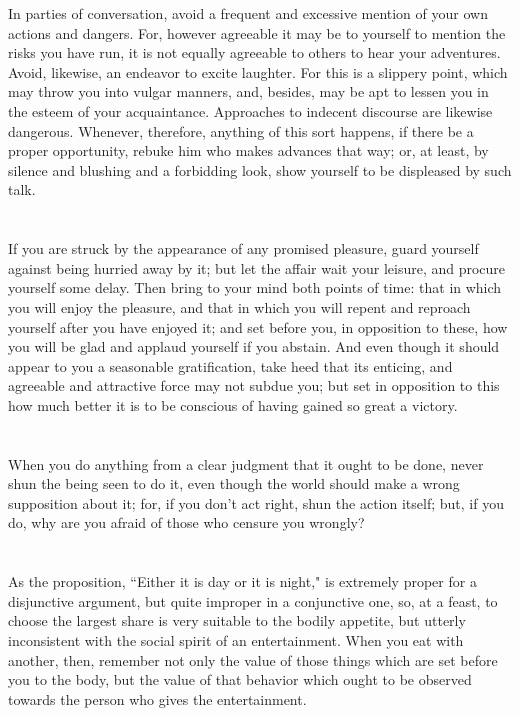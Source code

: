 \documentclass[12pt]{article}
\begin{document}
In parties of conversation, avoid a frequent and excessive mention
of your own actions and dangers. For, however agreeable it may be
to yourself to mention the risks you have run, it is not equally agreeable
to others to hear your adventures. Avoid, likewise, an endeavor to
excite laughter. For this is a slippery point, which may throw you
into vulgar manners, and, besides, may be apt to lessen you in the
esteem of your acquaintance. Approaches to indecent discourse are
likewise dangerous. Whenever, therefore, anything of this sort happens,
if there be a proper opportunity, rebuke him who makes advances that
way; or, at least, by silence and blushing and a forbidding look,
show yourself to be displeased by such talk. 

\section{}

If you are struck by the appearance of any promised pleasure,
guard yourself against being hurried away by it; but let the affair
wait your leisure, and procure yourself some delay. Then bring to
your mind both points of time: that in which you will enjoy the pleasure,
and that in which you will repent and reproach yourself after you
have enjoyed it; and set before you, in opposition to these, how you
will be glad and applaud yourself if you abstain. And even though
it should appear to you a seasonable gratification, take heed that
its enticing, and agreeable and attractive force may not subdue you;
but set in opposition to this how much better it is to be conscious
of having gained so great a victory. 

\section{}

When you do anything from a clear judgment that it ought to be
done, never shun the being seen to do it, even though the world should
make a wrong supposition about it; for, if you don't act right, shun
the action itself; but, if you do, why are you afraid of those who
censure you wrongly? 

\section{}

As the proposition, ``Either it is day or it is night," is extremely
proper for a disjunctive argument, but quite improper in a conjunctive
one, so, at a feast, to choose the largest share is very suitable
to the bodily appetite, but utterly inconsistent with the social spirit
of an entertainment. When you eat with another, then, remember not
only the value of those things which are set before you to the body,
but the value of that behavior which ought to be observed towards
the person who gives the entertainment. 
\end{document}
